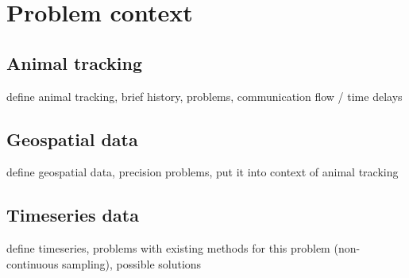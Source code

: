 
\chapter{Problem context}

\section{Animal tracking}

define animal tracking, brief history, problems, communication flow / time delays

\section{Geospatial data}

define geospatial data, precision problems, put it into context of animal tracking

\section{Timeseries data}

define timeseries, problems with existing methods for this problem (non-continuous sampling), possible solutions
